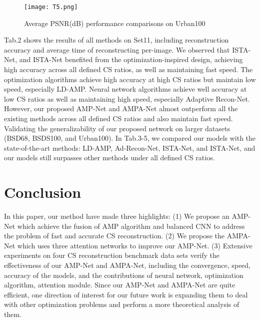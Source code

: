 \documentclass[conference]{IEEEtran}
\begin{document}
\begin{figure}[ht]
\centering
\caption{Average PSNR(dB) performance comparisons on Urban100}
\texttt{[image: T5.png]}
\label{tab:T5}
\end{figure}
Tab.2 shows the results of all methods on Set11, including reconstruction accuracy and average time of reconstructing per-image. We observed that ISTA-Net, and ISTA-Net benefited from the optimization-inspired design, achieving high accuracy across all defined CS ratios, as well as maintaining fast speed. The optimization algorithms achieve high accuracy at high CS ratios but maintain low speed, especially LD-AMP. Neural network algorithms achieve well accuracy at low CS ratios as well as maintaining high speed, especially Adaptive Recon-Net. However, our proposed AMP-Net and AMPA-Net almost outperform all the existing methods across all defined CS ratios and also maintain fast speed. Validating the generalizability of our proposed network on larger datasets (BSD68, BSDS100, and Urban100). In Tab.3-5, we compared our models with the state-of-the-art methods: LD-AMP, Ad-Recon-Net, ISTA-Net, and ISTA-Net, and our models still surpasses other methods under all defined CS ratios.
\section{Conclusion}
In this paper, our method have made three highlights: (1) We propose an AMP-Net which achieve the fusion of AMP algorithm and balanced CNN to address the problem of fast and accurate CS reconstruction. (2) We propose the AMPA-Net which uses three attention networks to improve our AMP-Net. (3) Extensive experiments on four CS reconstruction benchmark data sets verify the effectiveness of our AMP-Net and AMPA-Net, including the convergence, speed, accuracy of the models, and the contributions of neural network, optimization algorithm, attention module. Since our AMP-Net and AMPA-Net are quite efficient, one direction of interest for our future work is expanding them to deal with other optimization problems and perform a more theoretical analysis of them.
\end{document}
